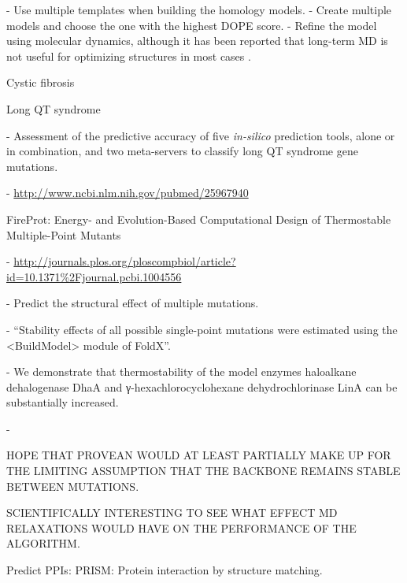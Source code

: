 
- Use multiple templates when building the homology models.
- Create multiple models and choose the one with the highest DOPE score.
- Refine the model using molecular dynamics, although it has been reported that long-term MD is not useful for optimizing structures in most cases \cite{raval_refinement_2012}.


Cystic fibrosis



Long QT syndrome

  - Assessment of the predictive accuracy of five \textit{in-silico} prediction tools, alone or in combination, and two meta-servers to classify long QT syndrome gene mutations.

  - \url{http://www.ncbi.nlm.nih.gov/pubmed/25967940}



FireProt: Energy- and Evolution-Based Computational Design of Thermostable Multiple-Point Mutants

  - \url{http://journals.plos.org/ploscompbiol/article?id=10.1371%2Fjournal.pcbi.1004556}

  - Predict the structural effect of multiple mutations.

  - ``Stability effects of all possible single-point mutations were estimated using the <BuildModel> module of FoldX''.

  - We demonstrate that thermostability of the model enzymes haloalkane dehalogenase DhaA and γ-hexachlorocyclohexane dehydrochlorinase LinA can be substantially increased.

  - \cite{bednar_fireprot:_2015}



HOPE THAT PROVEAN WOULD AT LEAST PARTIALLY MAKE UP FOR THE LIMITING ASSUMPTION THAT THE BACKBONE REMAINS STABLE BETWEEN MUTATIONS.

SCIENTIFICALLY INTERESTING TO SEE WHAT EFFECT MD RELAXATIONS WOULD HAVE ON THE PERFORMANCE OF THE ALGORITHM.

Predict PPIs: PRISM: Protein interaction by structure matching.


